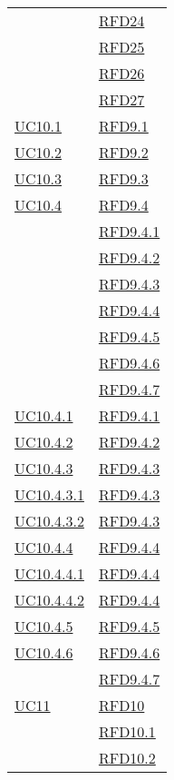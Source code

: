 \begin{longtable}{|>{\centering}m{5cm}|m{5cm}<{\centering}|}
& \hyperlink{RFD24}{RFD24}\\
& \hyperlink{RFD25}{RFD25}\\
& \hyperlink{RFD26}{RFD26}\\
& \hyperlink{RFD27}{RFD27}\\ \hline
\hyperref[UC10.1]{UC10.1} & \hyperlink{RFD9.1}{RFD9.1}\\ \hline
\hyperref[UC10.2]{UC10.2} & \hyperlink{RFD9.2}{RFD9.2}\\ \hline
\hyperref[UC10.3]{UC10.3} & \hyperlink{RFD9.3}{RFD9.3}\\ \hline
\hyperref[UC10.4]{UC10.4} & \hyperlink{RFD9.4}{RFD9.4}\\
& \hyperlink{RFD9.4.1}{RFD9.4.1}\\
& \hyperlink{RFD9.4.2}{RFD9.4.2}\\
& \hyperlink{RFD9.4.3}{RFD9.4.3}\\
& \hyperlink{RFD9.4.4}{RFD9.4.4}\\
& \hyperlink{RFD9.4.5}{RFD9.4.5}\\
& \hyperlink{RFD9.4.6}{RFD9.4.6}\\
& \hyperlink{RFD9.4.7}{RFD9.4.7}\\ \hline
\hyperref[UC10.4.1]{UC10.4.1} & \hyperlink{RFD9.4.1}{RFD9.4.1}\\ \hline
\hyperref[UC10.4.2]{UC10.4.2} & \hyperlink{RFD9.4.2}{RFD9.4.2}\\ \hline
\hyperref[UC10.4.3]{UC10.4.3} & \hyperlink{RFD9.4.3}{RFD9.4.3}\\ \hline
\hyperref[UC10.4.3.1]{UC10.4.3.1} & \hyperlink{RFD9.4.3}{RFD9.4.3}\\ \hline
\hyperref[UC10.4.3.2]{UC10.4.3.2} & \hyperlink{RFD9.4.3}{RFD9.4.3}\\ \hline
\hyperref[UC10.4.4]{UC10.4.4} & \hyperlink{RFD9.4.4}{RFD9.4.4}\\ \hline
\hyperref[UC10.4.4.1]{UC10.4.4.1} & \hyperlink{RFD9.4.4}{RFD9.4.4}\\ \hline
\hyperref[UC10.4.4.2]{UC10.4.4.2} & \hyperlink{RFD9.4.4}{RFD9.4.4}\\ \hline
\hyperref[UC10.4.5]{UC10.4.5} & \hyperlink{RFD9.4.5}{RFD9.4.5}\\ \hline
\hyperref[UC10.4.6]{UC10.4.6} & \hyperlink{RFD9.4.6}{RFD9.4.6}\\
& \hyperlink{RFD9.4.7}{RFD9.4.7}\\ \hline
\hyperref[UC11]{UC11} & \hyperlink{RFD10}{RFD10}\\
& \hyperlink{RFD10.1}{RFD10.1}\\
& \hyperlink{RFD10.2}{RFD10.2}\\

\end{longtable}
